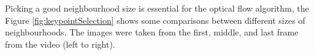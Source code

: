 \documentclass[12pt,a4paper]{article}
\begin{document}
Picking a good neighbourhood size is essential for the optical flow algorithm, the Figure \ref{fig:keypointSelection} shows some comparisons between different sizes of neighbourhoods. The images were taken from the first, middle, and last frame from the video (left to right). \\

\begin{figure}[!h]
	\centering
	{
		{
			\setlength{\fboxsep}{1pt}
			\setlength{\fboxrule}{1pt}
		}
	}
	\enskip
	{
		{
			\setlength{\fboxsep}{1pt}
			\setlength{\fboxrule}{1pt}
		}	
	}
	\enskip
	{
		{
			\setlength{\fboxsep}{1pt}
			\setlength{\fboxrule}{1pt}
		}	
	}
	

\end{figure}
\end{document}
